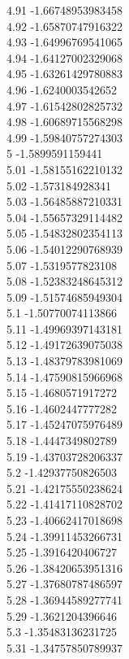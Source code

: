 {4.91	-1.66748953983458\\
4.92	-1.65870747916322\\
4.93	-1.64996769541065\\
4.94	-1.64127002329068\\
4.95	-1.63261429780883\\
4.96	-1.6240003542652\\
4.97	-1.61542802825732\\
4.98	-1.60689715568298\\
4.99	-1.59840757274303\\
5	-1.5899591159441\\
5.01	-1.58155162210132\\
5.02	-1.573184928341\\
5.03	-1.56485887210331\\
5.04	-1.55657329114482\\
5.05	-1.54832802354113\\
5.06	-1.54012290768939\\
5.07	-1.5319577823108\\
5.08	-1.52383248645312\\
5.09	-1.51574685949304\\
5.1	-1.50770074113866\\
5.11	-1.49969397143181\\
5.12	-1.49172639075038\\
5.13	-1.48379783981069\\
5.14	-1.47590815966968\\
5.15	-1.4680571917272\\
5.16	-1.4602447777282\\
5.17	-1.45247075976489\\
5.18	-1.4447349802789\\
5.19	-1.43703728206337\\
5.2	-1.42937750826503\\
5.21	-1.42175550238624\\
5.22	-1.41417110828702\\
5.23	-1.40662417018698\\
5.24	-1.39911453266731\\
5.25	-1.3916420406727\\
5.26	-1.38420653951316\\
5.27	-1.37680787486597\\
5.28	-1.36944589277741\\
5.29	-1.3621204396646\\
5.3	-1.35483136231725\\
5.31	-1.34757850789937\\
}
